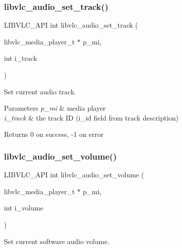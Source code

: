 \subsubsection{\texorpdfstring{libvlc\+\_\+audio\+\_\+set\+\_\+track()}{libvlc\_audio\_set\_track()}}
{\footnotesize\ttfamily L\+I\+B\+V\+L\+C\+\_\+\+A\+PI int libvlc\+\_\+audio\+\_\+set\+\_\+track (\begin{DoxyParamCaption}\item[{libvlc\+\_\+media\+\_\+player\+\_\+t $\ast$}]{p\+\_\+mi,  }\item[{int}]{i\+\_\+track }\end{DoxyParamCaption})}

Set current audio track.


\begin{DoxyParams}{Parameters}
{\em p\+\_\+mi} & media player \\
\hline
{\em i\+\_\+track} & the track ID (i\+\_\+id field from track description) \\
\hline
\end{DoxyParams}
\begin{DoxyReturn}{Returns}
0 on success, -\/1 on error 
\end{DoxyReturn}
\mbox{\label{group__libvlc__audio_ga56911e6b6cd4878796277c19203302a3}} 
\subsubsection{\texorpdfstring{libvlc\+\_\+audio\+\_\+set\+\_\+volume()}{libvlc\_audio\_set\_volume()}}
{\footnotesize\ttfamily L\+I\+B\+V\+L\+C\+\_\+\+A\+PI int libvlc\+\_\+audio\+\_\+set\+\_\+volume (\begin{DoxyParamCaption}\item[{libvlc\+\_\+media\+\_\+player\+\_\+t $\ast$}]{p\+\_\+mi,  }\item[{int}]{i\+\_\+volume }\end{DoxyParamCaption})}

Set current software audio volume.


